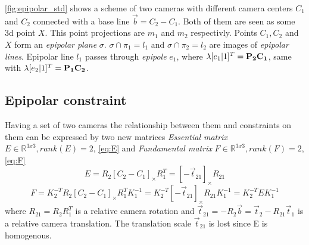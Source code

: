 \autoref{fig:epipolar_std} shows a scheme of two cameras with different camera centers $C_1$ and $C_2$ connected with a base line $\vec{b} = C_2 - C_1$. 
Both of them are seen as some 3d point $X$. 
This point projections are $m_1$ and $m_2$ respectivly. 
Points $C_1, C_2$ and $X$ form an \textit{epipolar plane} $\sigma$.
$\sigma \cap \pi_1 = l_1$ and $\sigma \cap \pi_2 = l_2$ are images of \textit{epipolar lines}. 
Epipolar line $l_1$ passes through \textit{epipole} $e_1$, where $\lambda [e_1 | 1]^T = \bf{P_2} C_1$, same with $\lambda [e_2 | 1]^T = \bf{P_1} C_2$.

\subsection{Epipolar constraint}

Having a set of two cameras the relationship between them and constraints on them can be expressed by two new matrices \textit{Essential matrix} $E \in \mathbb{R}^{3x3}, rank(E) = 2$, \autoref{eq:E} and \textit{Fundamental matrix} $F \in \mathbb{R}^{3x3}, rank(F) = 2$, \autoref{eq:F}
\begin{equation}
    \label{eq:E}
    E = R_2 [C_2 - C_1]_{\times} R_1^T = [-\vec{t}_{21}]_{\times}R_{21}    
\end{equation}
\begin{equation}
    \label{eq:F}
    F = K_2^{-T} R_2 [C_2 - C_1]_{\times} R_1^T K_1^{-1} = K_2^{-T} [-\vec{t}_{21}]_{\times} R_{21} K_1^{-1} = K_2^{-T} E K_1^{-1}
\end{equation}
where 
$R_{21} = R_2 R_1^T$ is a relative camera rotation and 
$\vec{t}_{21} = -R_2 \vec{b} = \vec{t}_2 - R_{21}\vec{t}_1$ is a relative camera translation.
The translation scale $\vec{t}_{21}$ is lost since E is homogenous.

